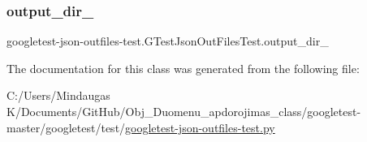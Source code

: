 \subsubsection{\texorpdfstring{output\_dir\_}{output\_dir\_}}
{\footnotesize\ttfamily googletest-\/json-\/outfiles-\/test.\+G\+Test\+Json\+Out\+Files\+Test.\+output\+\_\+dir\+\_\+}



The documentation for this class was generated from the following file\+:\begin{DoxyCompactItemize}
\item 
C\+:/\+Users/\+Mindaugas K/\+Documents/\+Git\+Hub/\+Obj\+\_\+\+Duomenu\+\_\+apdorojimas\+\_\+class/googletest-\/master/googletest/test/\mbox{\hyperlink{googletest-master_2googletest_2test_2googletest-json-outfiles-test_8py}{googletest-\/json-\/outfiles-\/test.\+py}}\end{DoxyCompactItemize}
